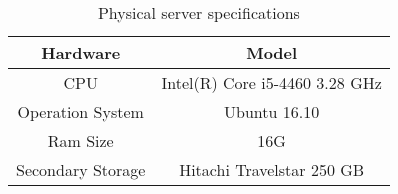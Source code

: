\begin{table}[H]
\centering
\begin{tabular}{|c|c|}
\hline
Hardware               & Model \\ \hline
CPU                    & Intel(R) Core i5-4460 3.28 GHz   \\ \hline
Operation System       & Ubuntu 16.10   \\ \hline
Ram Size               & 16G   \\ \hline
Secondary Storage      & Hitachi Travelstar 250 GB   \\ \hline
\end{tabular}
\caption{Physical server specifications}
\label{Tab:physicalserver}

\end{table}
